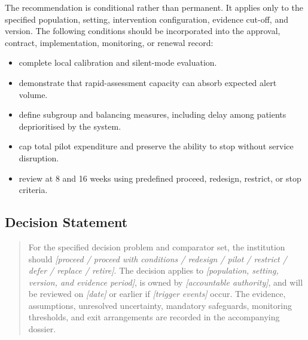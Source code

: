 The recommendation is conditional rather than permanent. It applies only to the
specified population, setting, intervention configuration, evidence cut-off, and
version. The following conditions should be incorporated into the approval,
contract, implementation, monitoring, or renewal record:

\begin{itemize}
 \item complete local calibration and silent-mode evaluation.
 \item demonstrate that rapid-assessment capacity can absorb expected alert volume.
 \item define subgroup and balancing measures, including delay among patients deprioritised by the system.
 \item cap total pilot expenditure and preserve the ability to stop without service disruption.
 \item review at 8 and 16 weeks using predefined proceed, redesign, restrict, or stop criteria.
\end{itemize}

\subsection{Decision Statement}
\begin{quote}
For the specified decision problem and comparator set, the institution should
\emph{[proceed / proceed with conditions / redesign / pilot / restrict / defer /
replace / retire]}. The decision applies to \emph{[population, setting, version,
and evidence period]}, is owned by \emph{[accountable authority]}, and will be
reviewed on \emph{[date]} or earlier if \emph{[trigger events]} occur. The
evidence, assumptions, unresolved uncertainty, mandatory safeguards, monitoring
thresholds, and exit arrangements are recorded in the accompanying dossier.
\end{quote}
